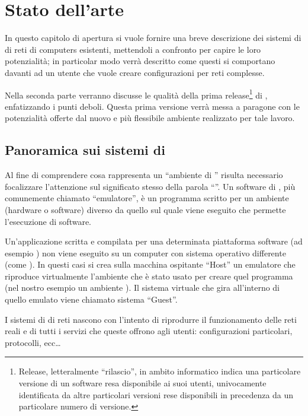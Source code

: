 \chapter{Stato dell'arte}\label{capitolo:arte}

In questo capitolo di apertura si vuole fornire una breve descrizione dei sistemi di \emulazione{} di reti di computers esistenti, mettendoli a confronto per capire le loro potenzialità; in particolar modo verrà descritto come questi si comportano davanti ad un utente che vuole creare configurazioni per reti complesse.

Nella seconda parte verranno discusse le qualità della prima release\footnote{Release, letteralmente ``rilascio'', in ambito informatico indica una particolare versione di un software resa disponibile ai suoi utenti, univocamente identificata da altre particolari versioni rese disponibili in precedenza da un particolare numero di versione.} di \visualnetkit{}, enfatizzando i punti deboli. Questa prima versione  verrà messa a paragone con le potenzialità offerte dal nuovo e più flessibile ambiente realizzato per tale lavoro.

\section{Panoramica sui sistemi di \emulazione{}}
Al fine di comprendere cosa rappresenta un ``ambiente di \emulazione{}'' risulta necessario focalizzare l'attenzione sul significato stesso della parola ``\emulazione{}''. Un software di \emulazione{}, più comunemente chiamato ``emulatore'', è un programma scritto per un ambiente (hardware o software) diverso da quello sul quale viene eseguito che permette l'esecuzione di software.

Un'applicazione scritta e compilata per una determinata piattaforma software (ad esempio \windows) non viene eseguito su un computer con sistema operativo differente (come \linux{}). In questi casi si crea sulla macchina ospitante ``Host'' un emulatore che riproduce virtualmente l'ambiente che è stato usato per creare quel programma (nel nostro esempio un ambiente \windows{}). Il sistema  virtuale che gira all'interno di quello emulato viene chiamato sistema ``Guest''.

I sistemi di \emulazione{} di reti nascono con l'intento di riprodurre il funzionamento delle reti reali e di tutti i servizi che queste offrono agli utenti: configurazioni particolari, protocolli, ecc\ldots

